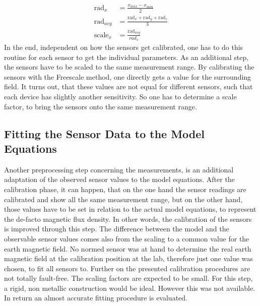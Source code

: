 \begin{equation} \label{eq:simpleScale}
\begin{aligned}
\mathrm{rad}_{x} &= \frac{x_{max} - x_{min}}{2}\\
\mathrm{rad}_{avg} &= \frac{\mathrm{rad}_{x} + \mathrm{rad}_{y} + \mathrm{rad}_{z}}{3}\\
\mathrm{scale}_{x} &= \frac{\mathrm{rad}_{avg}}{rad_{x}}
\end{aligned}
\end{equation}
In the end, independent on how the sensors get calibrated, one has to do this routine for each sensor to get the individual parameters. As an additional step, the sensors have to be scaled to the same measurement range. By calibrating the sensors with the Freescale method, one directly gets a value for the surrounding field. It turns out, that these values are not equal for different sensors, such that each device has slightly another sensitivity. So one has to determine a scale factor, to bring the sensors onto the same measurement range.


\subsection{Fitting the Sensor Data to the Model Equations} \label{subsec:modelFit}

Another preprocessing step concerning the measurements, is an additional adaptation of the observed sensor values to the model equations. After the calibration phase, it can happen, that on the one hand the sensor readings are calibrated and show all the same measurement range, but on the other hand, those values have to be set in relation to the actual model equations, to represent the de-facto magnetic flux density. In other words, the calibration of the sensors is improved through this step. The difference between the model and the observable sensor values comes also from the scaling to a common value for the earth magnetic field. No normed sensor was at hand to determine the real earth magnetic field at the calibration position at the lab, therefore just one value was chosen, to fit all sensors to. Further on the presented calibration procedures are not totally fault-free. The scaling factors are expected to be small. For this step, a rigid, non metallic construction would be ideal. However this was not available. In return an almost accurate fitting procedure is evaluated.

